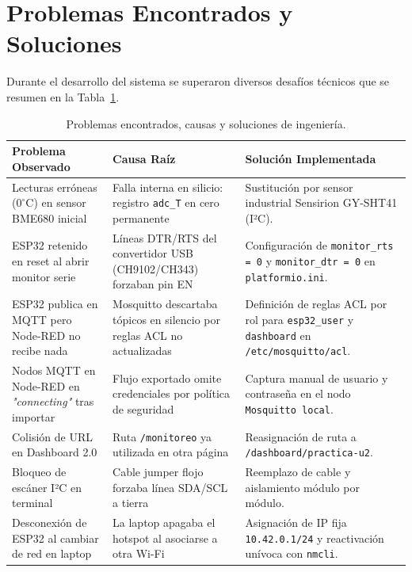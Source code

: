 \section{Problemas Encontrados y Soluciones}

Durante el desarrollo del sistema se superaron diversos desafíos técnicos que se resumen en la Tabla~\ref{tab:problemas_solucion}.

\begin{table}[H]
\centering
\small
\begin{tabularx}{\textwidth}{p{3.8cm} p{5.2cm} X}
\toprule
\textbf{Problema Observado} & \textbf{Causa Raíz} & \textbf{Solución Implementada} \\
\midrule
Lecturas erróneas ($0^\circ\text{C}$) en sensor BME680 inicial & Falla interna en silicio: registro \texttt{adc\_T} en cero permanente & Sustitución por sensor industrial Sensirion GY-SHT41 (I²C). \\
\addlinespace
ESP32 retenido en reset al abrir monitor serie & Líneas DTR/RTS del convertidor USB (CH9102/CH343) forzaban pin EN & Configuración de \texttt{monitor\_rts = 0} y \texttt{monitor\_dtr = 0} en \texttt{platformio.ini}. \\
\addlinespace
ESP32 publica en MQTT pero Node-RED no recibe nada & Mosquitto descartaba tópicos en silencio por reglas ACL no actualizadas & Definición de reglas ACL por rol para \texttt{esp32\_user} y \texttt{dashboard} en \texttt{/etc/mosquitto/acl}. \\
\addlinespace
Nodos MQTT en Node-RED en \textit{"connecting"} tras importar & Flujo exportado omite credenciales por política de seguridad & Captura manual de usuario y contraseña en el nodo \texttt{Mosquitto local}. \\
\addlinespace
Colisión de URL en Dashboard 2.0 & Ruta \texttt{/monitoreo} ya utilizada en otra página & Reasignación de ruta a \texttt{/dashboard/practica-u2}. \\
\addlinespace
Bloqueo de escáner I²C en terminal & Cable jumper flojo forzaba línea SDA/SCL a tierra & Reemplazo de cable y aislamiento módulo por módulo. \\
\addlinespace
Desconexión de ESP32 al cambiar de red en laptop & La laptop apagaba el hotspot al asociarse a otra Wi-Fi & Asignación de IP fija \texttt{10.42.0.1/24} y reactivación unívoca con \texttt{nmcli}. \\
\bottomrule
\end{tabularx}
\caption{Problemas encontrados, causas y soluciones de ingeniería.}
\label{tab:problemas_solucion}
\end{table}
